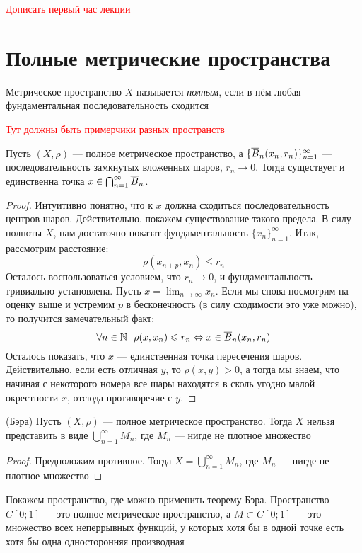  \textcolor{red}{Дописать первый час лекции}
 
 \section{Полные метрические пространства}
 
 \begin{definition}
 	Метрическое пространство $X$ называется \textit{полным}, если в нём любая фундаментальная последовательность сходится
 \end{definition}

\begin{example}
	\textcolor{red}{Тут должны быть примерчики разных пространств}
\end{example}

\begin{theorem}
	Пусть $(X, \rho)$ --- полное метрическое пространство, а $\{\overline{B}_n(x_n, r_n)\}_{n = 1}^\infty$ --- последовательность замкнутых вложенных шаров, $r_n \to 0$. Тогда существует и единственна точка $x \in \bigcap_{n = 1}^\infty \overline{B}_n$.
\end{theorem}

\begin{proof}
	Интуитивно понятно, что к $x$ должна сходиться последовательность центров шаров. Действительно, покажем существование такого предела. В силу полноты $X$, нам достаточно показат фундаментальность $\{x_n\}_{n = 1}^\infty$. Итак, рассмотрим расстояние:
	\[
		\rho(x_{n + p}, x_n) \le r_n
	\]
	Осталось воспользоваться условием, что $r_n \to 0$, и фундаментальность тривиально установлена. Пусть $x = \lim_{n \to \infty} x_n$. Если мы снова посмотрим на оценку выше и устремим $p$ в бесконечность (в силу сходимости это уже можно), то получится замечательный факт:
	\[
		\forall n \in \N\ \ \rho(x, x_n) \le r_n \Lra x \in \ole{B}_n(x_n, r_n)
	\]
	Осталось показать, что $x$ --- единственная точка пересечения шаров. Действительно, если есть отличная $y$, то $\rho(x, y) > 0$, а тогда мы знаем, что начиная с некоторого номера все шары находятся в сколь угодно малой окрестности $x$, отсюда противоречие с $y$.
\end{proof}

\begin{theorem} (Бэра)
	Пусть $(X, \rho)$ --- полное метрическое пространство. Тогда $X$ нельзя представить в виде $\bigcup_{n = 1}^\infty M_n$, где $M_n$ --- нигде не плотное множество
\end{theorem}

\begin{proof}
	Предположим противное. Тогда $X = \bigcup_{n = 1}^\infty M_n$, где $M_n$ --- нигде не плотное множество 
\end{proof}

\begin{example}
	Покажем пространство, где можно применить теорему Бэра. Пространство $C[0; 1]$ --- это полное метрическое пространство, а $M \subset C[0; 1]$ --- это множество всех неперрывных функций, у которых хотя бы в одной точке есть хотя бы одна односторонняя производная
\end{example}
